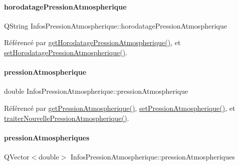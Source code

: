 \paragraph{\texorpdfstring{horodatage\+Pression\+Atmospherique}{horodatagePressionAtmospherique}}
{\footnotesize\ttfamily Q\+String Infos\+Pression\+Atmospherique\+::horodatage\+Pression\+Atmospherique\hspace{0.3cm}{\ttfamily [private]}}



Référencé par \hyperlink{class_infos_pression_atmospherique_a6836dfc16f1be4287354ea26a080b436}{get\+Horodatage\+Pression\+Atmospherique()}, et \hyperlink{class_infos_pression_atmospherique_a5d8ba94db66bb7bcdf5a70dd6f21de23}{set\+Horodatage\+Pression\+Atmospherique()}.

\mbox{\label{class_infos_pression_atmospherique_a69f31dc0d0ef59f8ced23e4663ee1ab8}} 
\paragraph{\texorpdfstring{pression\+Atmospherique}{pressionAtmospherique}}
{\footnotesize\ttfamily double Infos\+Pression\+Atmospherique\+::pression\+Atmospherique\hspace{0.3cm}{\ttfamily [private]}}



Référencé par \hyperlink{class_infos_pression_atmospherique_ace9906ecdd245d4d443554fcc77c76a5}{get\+Pression\+Atmospherique()}, \hyperlink{class_infos_pression_atmospherique_ab598771e222fbca604ac6dba5d2aacb9}{set\+Pression\+Atmospherique()}, et \hyperlink{class_infos_pression_atmospherique_ab280f47f2a1376222a45fde8638489d2}{traiter\+Nouvelle\+Pression\+Atmospherique()}.

\mbox{\label{class_infos_pression_atmospherique_a38218b11dc9fb22aca7525f93155a26c}} 
\paragraph{\texorpdfstring{pression\+Atmospheriques}{pressionAtmospheriques}}
{\footnotesize\ttfamily Q\+Vector$<$double$>$ Infos\+Pression\+Atmospherique\+::pression\+Atmospheriques\hspace{0.3cm}{\ttfamily [private]}}



